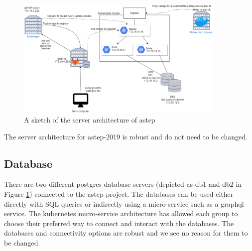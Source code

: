 \begin{figure}
    \centering
    \includegraphics[width=0.9\textwidth]{Pictures/Sprint_1/server_architecture.png}
    \caption{A sketch of the server architecture of \gls{astep} \cite{astep}}
    \label{fig:server_architecture}
\end{figure}

The server architecture for \gls{astep}-2019 is robust and do not need to be changed.

\subsection{Database}
There are two different \gls{postgres} database servers (depicted as db1 and db2 in Figure \ref{fig:server_architecture}) connected to the \gls{astep} project. The databases can be used either directly with SQL queries or indirectly using a micro-service such as a \gls{graphql} service. The \gls{kubernetes} micro-service architecture has allowed each group to choose their preferred way to connect and interact with the databases. The databases and connectivity options are robust and we see no reason for them to be changed.